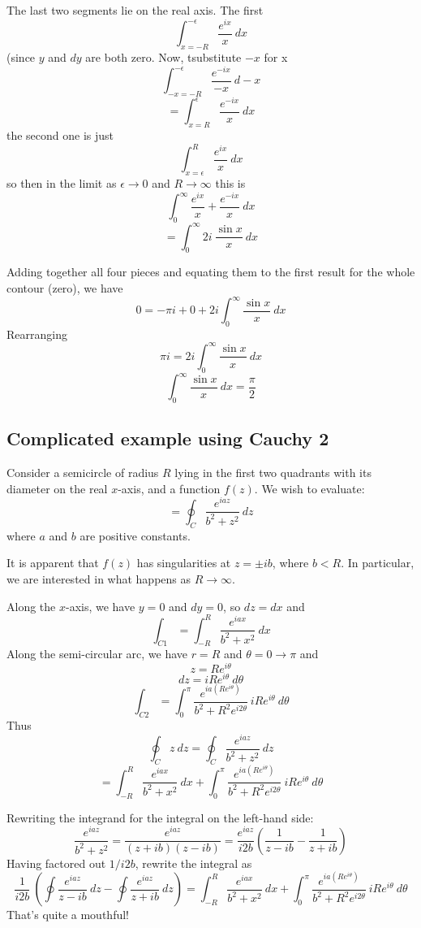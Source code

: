 \documentclass[11pt, oneside]{article}   	%
\begin{document}
The last two segments lie on the real axis.  The first
\[ \int_{x=-R}^{-\epsilon} \frac{e^{ix}}{x} \ dx \]
(since $y$ and $dy$ are both zero.  Now, tsubstitute $-x$ for x
\[ \int _{-x=-R}^{-\epsilon} \frac{e^{-ix}}{-x} \ d -x \]
\[ = \int _{x=R}^{\epsilon} \frac{e^{-ix}}{x} \ dx \]
the second one is just
\[ \int _{x=\epsilon}^{R} \frac{e^{ix}}{x} \ dx \]
so then in the limit as $\epsilon \rightarrow 0$ and $R \rightarrow \infty$ this is
\[ \int_0^{\infty} \frac{e^{ix}}{x} + \frac{e^{-ix}}{x} \ dx \]
\[ =  \int_0^{\infty} 2i \ \frac{\sin x}{x} \ dx \]

Adding together all four pieces and equating them to the first result for the whole contour (zero), we have
\[ 0 =  -\pi i + 0 + 2i \int_0^{\infty} \frac{\sin x}{x} \ dx  \]
Rearranging 
\[ \pi i = 2i \int_0^{\infty} \frac{\sin x}{x} \ dx  \]
\[  \int_0^{\infty} \frac{\sin x}{x} \ dx = \frac{\pi}{2}  \]

\subsection*{Complicated example using Cauchy 2}
Consider a semicircle of radius $R$ lying in the first two quadrants with its diameter on the real $x$-axis, and a function $f(z)$.   We wish to evaluate:
\[ = \oint_C \frac{e^{iaz}}{b^2 + z^2} \ dz \]
where $a$ and $b$ are positive constants.

It is apparent that $f(z)$ has singularities at $z = \pm ib$, where $b < R$.  In particular, we are interested in what happens as $R \rightarrow \infty$.

Along the $x$-axis, we have $y=0$ and $dy = 0$, so $dz = dx$ and
\[ \int_{C1} = \int_{-R}^R \frac{e^{iax}}{b^2 + x^2} \ dx \]
Along the semi-circular arc, we have $r = R$ and $\theta = 0 \rightarrow \pi$ and
\[ z = Re^{i\theta} \]
\[ dz = iRe^{i\theta} \ d \theta \]
\[ \int_{C2} = \int_0^{\pi}  \frac{e^{ia(Re^{i\theta})}}{b^2 + R^2e^{i2\theta}}  \ iRe^{i\theta} \ d \theta \]
Thus
\[ \oint_C z \ dz = \oint_C \frac{e^{iaz}}{b^2 + z^2} \ dz \]
\[ = \int_{-R}^R \frac{e^{iax}}{b^2 + x^2} \ dx + \int_0^{\pi}  \frac{e^{ia(Re^{i\theta})}}{b^2 + R^2e^{i2\theta}}  \ iRe^{i\theta} \ d \theta \]

Rewriting the integrand for the integral on the left-hand side:
\[ \frac{e^{iaz}}{b^2 + z^2} = \frac{e^{iaz}}{(z + ib)(z - ib)} = \frac{e^{iaz}}{i2b} ( \frac{1}{z-ib} - \frac{1}{z+ib}) \]
Having factored out $1/i2b$, rewrite the integral as
\[ \frac{1}{i2b} \ (\oint \frac{e^{iaz}}{z-ib} \ dz - \oint \frac{e^{iaz}}{z + ib} \ dz) = \int_{-R}^R \frac{e^{iax}}{b^2 + x^2} \ dx + \int_0^{\pi}  \frac{e^{ia(Re^{i\theta})}}{b^2 + R^2e^{i2\theta}}  \ iRe^{i\theta} \ d \theta \]
That's quite a mouthful!
\end{document}

